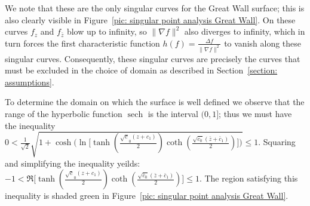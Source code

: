 \documentclass[12pt]{article}
\theoremstyle{plain}
\theoremstyle{definition}
\theoremstyle{remark}
\begin{document}
 We note that these are the only singular curves for the Great Wall surface; this is also clearly visible in Figure~\ref{pic: singular point analysis Great Wall}. On these curves \(f_z\) and \(f_{\bar z}\) blow up to infinity, so \(\|\nabla f\|^2\) also diverges to infinity, which in turn forces the first characteristic function \(h(f)=\tfrac{\Delta f}{\|\nabla f\|^2}\) to vanish along these singular curves. Consequently, these singular curves are precisely the curves that must be excluded in the choice of domain as described in Section~\ref{section: assumptions}.
 
 To determine the domain on which the surface is well defined we observe that the range of the hyperbolic function \(\operatorname{sech}\) is the interval \((0,1]\); thus we must have the inequality \(0<\tfrac{1}{\sqrt{2}}\sqrt{1 + \cosh\big(\ln\big[\tanh(\tfrac{\sqrt c_0(z+c_1)}{2})\coth(\tfrac{\sqrt{\bar c_0}(\bar z+\bar c_1)}{2})\big]\big)}\leq 1\). Squaring and simplifying the inequality yeilds: \(-1<\Re\!\big[\tanh(\tfrac{\sqrt c_0(z+c_1)}{2})\coth(\tfrac{\sqrt{\bar c_0}(\bar z+\bar c_1)}{2})\big]\leq 1\). The region satisfying this inequality is shaded green in Figure~\ref{pic: singular point analysis Great Wall}.
  
\end{document}

